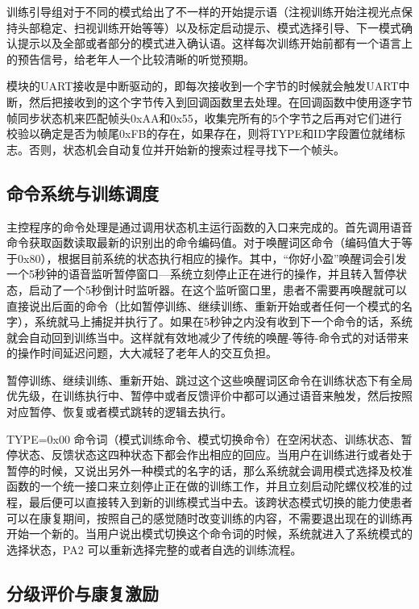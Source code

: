 训练引导组对于不同的模式给出了不一样的开始提示语（注视训练开始注视光点保持头部稳定、扫视训练开始等等）以及标定启动提示、模式选择引导、下一模式确认提示以及全部或者部分的模式进入确认语。这样每次训练开始前都有一个语言上的预告信号，给老年人一个比较清晰的听觉预期。

模块的UART接收是中断驱动的，即每次接收到一个字节的时候就会触发UART中断，然后把接收到的这个字节传入到回调函数里去处理。在回调函数中使用逐字节帧同步状态机来匹配帧头0xAA和0x55，收集完所有的5个字节之后再对它们进行校验以确定是否为帧尾0xFB的存在，如果存在，则将TYPE和ID字段置位就绪标志。否则，状态机会自动复位并开始新的搜索过程寻找下一个帧头。

\subsection{命令系统与训练调度}

主控程序的命令处理是通过调用状态机主运行函数的入口来完成的。首先调用语音命令获取函数读取最新的识别出的命令编码值。对于唤醒词区命令（编码值大于等于0x80），根据目前系统的状态执行相应的操作。其中，“你好小盈”唤醒词会引发一个5秒钟的语音监听暂停窗口—系统立刻停止正在进行的操作，并且转入暂停状态，启动了一个5秒倒计时监听器。在这个监听窗口里，患者不需要再唤醒就可以直接说出后面的命令（比如暂停训练、继续训练、重新开始或者任何一个模式的名字），系统就马上捕捉并执行了。如果在5秒钟之内没有收到下一个命令的话，系统就会自动回到训练当中。这样就有效地减少了传统的唤醒-等待-命令式的对话带来的操作时间延迟问题，大大减轻了老年人的交互负担。

暂停训练、继续训练、重新开始、跳过这个这些唤醒词区命令在训练状态下有全局优先级，在训练执行中、暂停中或者反馈评价中都可以通过语音来触发，然后按照对应暂停、恢复或者模式跳转的逻辑去执行。

TYPE=0x00 命令词（模式训练命令、模式切换命令）在空闲状态、训练状态、暂停状态、反馈状态这四种状态下都会作出相应的回应。当用户在训练进行或者处于暂停的时候，又说出另外一种模式的名字的话，那么系统就会调用模式选择及校准函数的一个统一接口来立刻停止正在做的训练工作，并且立刻启动陀螺仪校准的过程，最后便可以直接转入到新的训练模式当中去。该跨状态模式切换的能力使患者可以在康复期间，按照自己的感觉随时改变训练的内容，不需要退出现在的训练再开始一个新的。当用户说出模式切换这个命令词的时候，系统就进入了系统模式的选择状态，PA2 可以重新选择完整的或者自选的训练流程。

\subsection{分级评价与康复激励}

